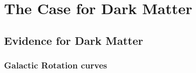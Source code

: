 
\chapter{The Case for Dark Matter}

\section{Evidence for Dark Matter}



\subsection{Galactic Rotation curves}


